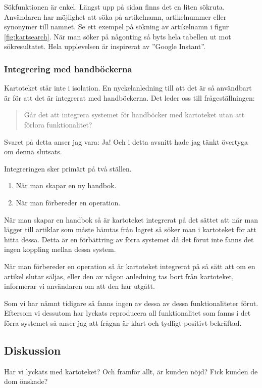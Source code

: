 Sökfunktionen är enkel.
Längst upp på sidan finns det en liten sökruta.
Användaren har möjlighet att söka på artikelnamn, artikelnummer
eller synonymer till namnet. Se ett exempel på sökning
av artikelnamn i figur \ref{fig:kartsearch}.
När man söker på någonting så byts hela tabellen ut mot sökresultatet.
Hela upplevelsen är inspirerat av ''Google Instant''.

\clearpage
\subsubsection{Integrering med handböckerna}
Kartoteket står inte i isolation.
En nyckelanledning till att det är så användbart är
för att det är integrerat med handböckerna.
Det leder oss till frågeställningen:
\begin{quote}
  Går det att integrera systemet för handböcker med kartoteket utan att förlora funktionalitet?
\end{quote}
Svaret på detta anser jag vara: Ja!
Och i detta avsnitt hade jag tänkt övertyga om denna slutsats.

Integreringen sker primärt på två ställen.
\begin{enumerate}
  \item När man skapar en ny handbok.
  \item När man förbereder en operation.
\end{enumerate}

När man skapar en handbok så är kartoteket integrerat på det sättet att
när man lägger till artiklar som måste hämtas från lagret så söker man
i kartoteket för att hitta dessa. Detta är en förbättring av förra
systemet då det förut inte fanns det ingen koppling mellan dessa system.

När man förbereder en operation så är kartoteket integrerat på
så sätt att om en artikel slutar säljas, eller den av någon anledning
tas bort från kartoteket, informerar vi användaren om att den
har utgått.

Som vi har nämnt tidigare så fanns ingen av dessa av dessa funktionaliteter
förut. Eftersom vi dessutom har lyckats reproducera all funktionalitet
som fanns i det förra systemet så anser jag att frågan är klart och
tydligt positivt bekräftad.


\subsection{Diskussion}
Har vi lyckats med kartoteket? Och framför allt, är
kunden nöjd? Fick kunden de dom önskade?

